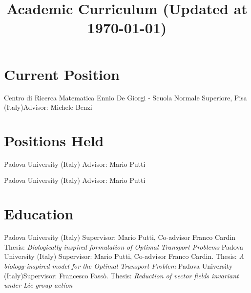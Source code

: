 \documentclass[11pt,a4paper,roman]{moderncv}
\title{Academic Curriculum \tiny{(Updated at \today)}}
\begin{document}
\nocite{*}
\makecvtitle


\section{Current Position}
{Centro di Ricerca Matematica Ennio De Giorgi - Scuola Normale Superiore, Pisa (Italy)}{Advisor: Michele Benzi} 
{}%
{}

\section{Positions Held}

{Padova University (Italy)}{} 
{Advisor: Mario Putti}%
{%
}

{Padova University (Italy)}{} 
{Advisor: Mario Putti}
{}

\section{Education}
{Padova University (Italy)}{}
{Supervisor: 
  Mario Putti,
  Co-advisor
  Franco Cardin 
  Thesis: \emph{Biologically inspired formulation of 
    Optimal Transport Problems}}
{}{}
{Padova University (Italy)}{}
{Supervisor: Mario Putti, Co-advisor
  Franco Cardin.  Thesis: \emph{A biology-inspired model for the
Optimal Transport Problem}}
{}{}
 {Padova University
  (Italy)}{}{Supervisor: Francesco Fass\`o. Thesis: \emph{Reduction of
    vector fields invariant under Lie group action}}{}
\end{document}
